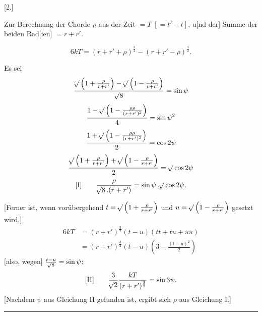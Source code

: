 \clearpage
{}
\begin{center}
[2.]\par
\medskip
Zur Berechnung der Chorde \(\rho\) aus der Zeit \(=T\;[=t'-t]\), u[nd der] Summe der beiden Rad[ien] \(=r+r'\).
\end{center}
\[
6kT=(r+r'+\rho)^{\frac{3}{2}}-(r+r'-\rho)^{\frac{3}{2}}.
\]

Es sei
\[
\frac{\mathord{{}^{}\!\surd}\left(1+\frac{\rho}{r+r'}\right)-\mathord{{}^{}\!\surd}\left(1-\frac{\rho}{r+r'}\right)}{\mathord{{}^{}\!\surd}8}=\sin\psi
\]
\[
\frac{1-\mathord{{}^{}\!\surd}\left(1-\frac{\rho\rho}{(r+r')^2}\right)}{4}=\sin\psi^2
\]
\[
\frac{1+\mathord{{}^{}\!\surd}\left(1-\frac{\rho\rho}{(r+r')^2}\right)}{2}=\cos2\psi
\]
\[
\frac{\mathord{{}^{}\!\surd}\left(1+\frac{\rho}{r+r'}\right)+\mathord{{}^{}\!\surd}\left(1-\frac{\rho}{r+r'}\right)}{2}=\mathord{{}^{}\!\surd}\cos2\psi
\]
\[
\mathrm{[I]}\qquad \frac{\rho}{\mathord{{}^{}\!\surd}8\,.(r+r')}=\sin\psi\,.\mathord{{}^{}\!\surd}\cos2\psi.
\]

[Ferner ist, wenn vorübergehend \(t=\mathord{{}^{}\!\surd}\left(1+\frac{\rho}{r+r'}\right)\) und \(u=\mathord{{}^{}\!\surd}\left(1-\frac{\rho}{r+r'}\right)\) gesetzt wird,]
\[
\begin{aligned}
6kT&=(r+r')^{\frac{3}{2}}(t-u)(tt+tu+uu)\\
&=(r+r')^{\frac{3}{2}}(t-u)\left(3-\frac{(t-u)^2}{2}\right)
\end{aligned}
\]
[also, wegen] \(\frac{t-u}{\mathord{{}^{}\!\surd}8}=\sin\psi\):
\[
\mathrm{[II]}\qquad \frac{3}{\mathord{{}^{}\!\surd}2}\frac{kT}{(r+r')^{\frac{3}{2}}}=\sin3\psi.
\]
[Nachdem \(\psi\) aus Gleichung II gefunden ist, ergibt sich \(\rho\) aus Gleichung I.]
\begin{center}\rule{.3\linewidth}{.4pt}\end{center}

